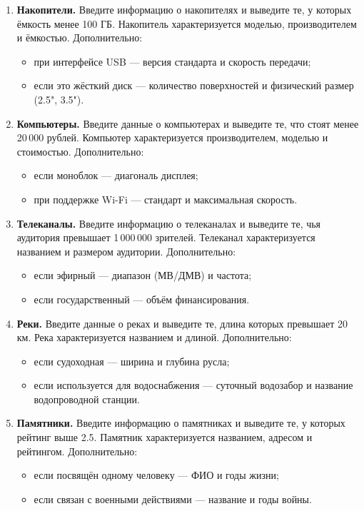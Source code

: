 \begin{enumerate}
    \item \textbf{Накопители.}  
    Введите информацию о накопителях и выведите те, у которых ёмкость менее 100 ГБ.  
    Накопитель характеризуется моделью, производителем и ёмкостью.  
    Дополнительно:
    \begin{itemize}
        \item при интерфейсе USB — версия стандарта и скорость передачи;
        \item если это жёсткий диск — количество поверхностей и физический размер (2.5", 3.5").
    \end{itemize}

    \item \textbf{Компьютеры.}  
    Введите данные о компьютерах и выведите те, что стоят менее 20\,000 рублей.  
    Компьютер характеризуется производителем, моделью и стоимостью.  
    Дополнительно:
    \begin{itemize}
        \item если моноблок — диагональ дисплея;
        \item при поддержке Wi-Fi — стандарт и максимальная скорость.
    \end{itemize}

    \item \textbf{Телеканалы.}  
    Введите информацию о телеканалах и выведите те, чья аудитория превышает 1\,000\,000 зрителей.  
    Телеканал характеризуется названием и размером аудитории.  
    Дополнительно:
    \begin{itemize}
        \item если эфирный — диапазон (МВ/ДМВ) и частота;
        \item если государственный — объём финансирования.
    \end{itemize}

    \item \textbf{Реки.}  
    Введите данные о реках и выведите те, длина которых превышает 20 км.  
    Река характеризуется названием и длиной.  
    Дополнительно:
    \begin{itemize}
        \item если судоходная — ширина и глубина русла;
        \item если используется для водоснабжения — суточный водозабор и название водопроводной станции.
    \end{itemize}

    \item \textbf{Памятники.}  
    Введите информацию о памятниках и выведите те, у которых рейтинг выше 2.5.  
    Памятник характеризуется названием, адресом и рейтингом.  
    Дополнительно:
    \begin{itemize}
        \item если посвящён одному человеку — ФИО и годы жизни;
        \item если связан с военными действиями — название и годы войны.
    \end{itemize}


\end{enumerate}
